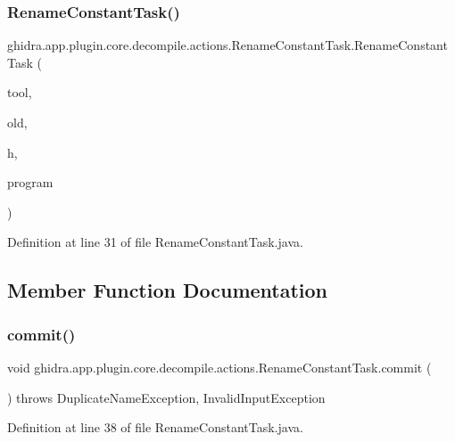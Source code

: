 \subsubsection{\texorpdfstring{RenameConstantTask()}{RenameConstantTask()}}
{\footnotesize\ttfamily ghidra.\+app.\+plugin.\+core.\+decompile.\+actions.\+Rename\+Constant\+Task.\+Rename\+Constant\+Task (\begin{DoxyParamCaption}\item[{Plugin\+Tool}]{tool,  }\item[{String}]{old,  }\item[{High\+Constant}]{h,  }\item[{Program}]{program }\end{DoxyParamCaption})\hspace{0.3cm}{\ttfamily [inline]}}



Definition at line 31 of file Rename\+Constant\+Task.\+java.



\subsection{Member Function Documentation}
\mbox{\label{classghidra_1_1app_1_1plugin_1_1core_1_1decompile_1_1actions_1_1_rename_constant_task_a6384e3306df3c9e12f1398eb682db5af}} 
\subsubsection{\texorpdfstring{commit()}{commit()}}
{\footnotesize\ttfamily void ghidra.\+app.\+plugin.\+core.\+decompile.\+actions.\+Rename\+Constant\+Task.\+commit (\begin{DoxyParamCaption}{ }\end{DoxyParamCaption}) throws Duplicate\+Name\+Exception, Invalid\+Input\+Exception\hspace{0.3cm}{\ttfamily [inline]}}



Definition at line 38 of file Rename\+Constant\+Task.\+java.

